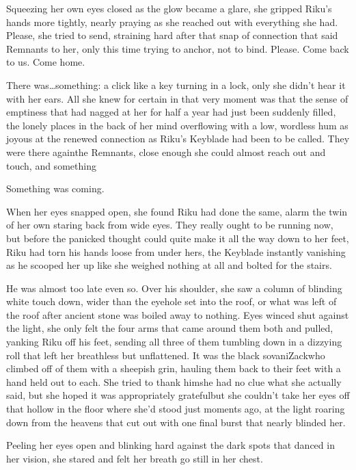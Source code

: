 Squeezing her own eyes closed as the glow became a glare, she gripped Riku's hands more tightly, nearly praying as she reached out with everything she had. Please, she tried to send, straining hard after that snap of connection that said Remnants to her, only this time trying to anchor, not to bind. Please. Come back to us. Come home.

There was\ldots something: a click like a key turning in a lock, only she didn't hear it with her ears. All she knew for certain in that very moment was that the sense of emptiness that had nagged at her for half a year had just been suddenly filled, the lonely places in the back of her mind overflowing with a low, wordless hum as joyous at the renewed connection as Riku's Keyblade had been to be called. They were there again\textemdash the Remnants, close enough she could almost reach out and touch, and something\textemdash 

Something was coming.

When her eyes snapped open, she found Riku had done the same, alarm the twin of her own staring back from wide eyes. They really ought to be running now, but before the panicked thought could quite make it all the way down to her feet, Riku had torn his hands loose from under hers, the Keyblade instantly vanishing as he scooped her up like she weighed nothing at all and bolted for the stairs.

He was almost too late even so. Over his shoulder, she saw a column of blinding white touch down, wider than the eyehole set into the roof, or what was left of the roof after ancient stone was boiled away to nothing. Eyes winced shut against the light, she only felt the four arms that came around them both and pulled, yanking Riku off his feet, sending all three of them tumbling down in a dizzying roll that left her breathless but unflattened. It was the black sovani\textemdash Zack\textemdash who climbed off of them with a sheepish grin, hauling them back to their feet with a hand held out to each. She tried to thank him\textemdash she had no clue what she actually said, but she hoped it was appropriately grateful\textemdash but she couldn't take her eyes off that hollow in the floor where she'd stood just moments ago, at the light roaring down from the heavens that cut out with one final burst that nearly blinded her.

Peeling her eyes open and blinking hard against the dark spots that danced in her vision, she stared and felt her breath go still in her chest.

